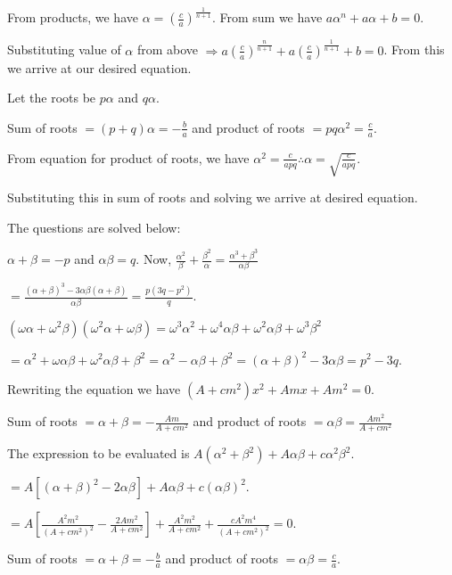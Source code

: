   From products, we have $\alpha = \left(\frac{c}{a}\right)^{\frac{1}{n + 1}}$. From sum we have $a\alpha^n + a\alpha + b = 0$.

  Substituting value of $\alpha$ from above $\Rightarrow a\left(\frac{c}{a}\right)^{\frac{n}{n + 1}} +
  a\left(\frac{c}{a}\right)^{\frac{1}{n + 1}} + b = 0$.  From this we arrive at our desired equation.
\item Let the roots be $p\alpha$ and $q\alpha$.

  Sum of roots $= (p + q)\alpha = -\frac{b}{a}$ and product of roots $= pq\alpha^2 = \frac{c}{a}$.

  From equation for product of roots, we have $\alpha^2 = \frac{c}{apq} \therefore \alpha = \sqrt{\frac{c}{apq}}$.

  Substituting this in sum of roots and solving we arrive at desired equation.
\item The questions are solved below:
  \startitemize[i]
  \item $\alpha + \beta = -p$ and $\alpha\beta = q$. Now, $\frac{\alpha^2}{\beta} + \frac{\beta^2}{\alpha} =
    \frac{\alpha^3 + \beta^3}{\alpha\beta}$

    $= \frac{(\alpha + \beta)^3 - 3\alpha\beta(\alpha + \beta)}{\alpha\beta} = \frac{p(3q - p^2)}{q}$.
  \item $(\omega\alpha + \omega^2\beta)(\omega^2\alpha + \omega\beta) = \omega^3\alpha^2 +
    \omega^4\alpha\beta + \omega^2\alpha\beta + \omega^3\beta^2$

    $= \alpha^2 + \omega\alpha\beta + \omega^2\alpha\beta + \beta^2 = \alpha^2 -\alpha\beta + \beta^2 =
    (\alpha + \beta)^2 - 3\alpha\beta = p^2 - 3q$.
  \stopitemize
\item Rewriting the equation we have $(A + cm^2)x^2 + Amx + Am^2 = 0$.

  Sum of roots $= \alpha + \beta = -\frac{Am}{A + cm^2}$ and product of roots $= \alpha\beta = \frac{Am^2}{A + cm^2}$

  The expression to be evaluated is $A(\alpha^2 + \beta^2) + A\alpha\beta + c\alpha^2\beta^2$.

  $= A[(\alpha + \beta)^2 - 2\alpha\beta] + A\alpha\beta + c(\alpha\beta)^2$.

  $= A\left[\frac{A^2m^2}{(A + cm^2)^2} - \frac{2Am^2}{A + cm^2}\right] + \frac{A^2m^2}{A + cm^2} + \frac{cA^2m^4}{(A +
    cm^2)^2} = 0$.
\item Sum of roots $= \alpha + \beta = -\frac{b}{a}$ and product of roots $= \alpha\beta = \frac{c}{a}$.

